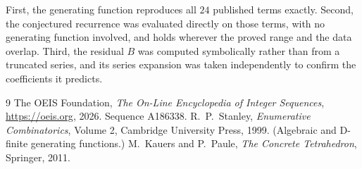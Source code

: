 \documentclass[11pt,a4paper]{article}
\theoremstyle{plain}
\theoremstyle{definition}
\begin{document}
First, the generating function reproduces all $24$ published terms exactly. Second,
the conjectured recurrence was evaluated directly on those terms, with no generating function
involved, and holds wherever the proved range and the data overlap. Third, the residual $B$ was
computed symbolically rather than from a truncated series, and its series expansion was taken
independently to confirm the coefficients it predicts.

\begin{thebibliography}{9}
 The OEIS Foundation, \emph{The On-Line Encyclopedia of Integer Sequences},
\url{https://oeis.org}, 2026. Sequence A186338.
 R.~P.~Stanley, \emph{Enumerative Combinatorics}, Volume 2, Cambridge
University Press, 1999. (Algebraic and D-finite generating functions.)
 M.~Kauers and P.~Paule, \emph{The Concrete Tetrahedron}, Springer, 2011.
\end{thebibliography}
\end{document}

